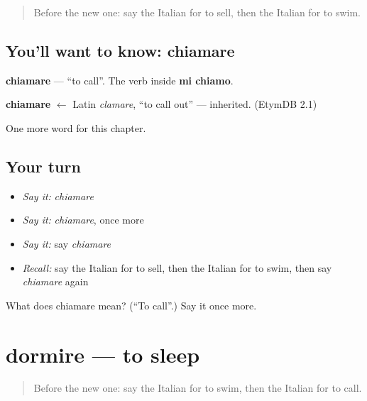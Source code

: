 \label{lesson:IT-C48-chiamare}



\begin{quote}
Before the new one: say the Italian for to sell, then the Italian for to swim.
\end{quote}

\subsection*{You'll want to know: chiamare}
\textbf{chiamare} — \textquotedblleft{}to call\textquotedblright{}. The verb inside \textbf{mi chiamo}.

\begin{cousinweb}
\textbf{chiamare} $\leftarrow$ Latin \emph{clamare}, \textquotedblleft{}to call out\textquotedblright{} — inherited. (EtymDB 2.1)
\end{cousinweb}

\begin{grammarlens}[title={What you've built}]
One more word for this chapter.
\end{grammarlens}

\subsection*{Your turn}
\begin{itemize}
\raggedright
  \item \emph{Say it:} \emph{chiamare}
  \item \emph{Say it:} \emph{chiamare}, once more
  \item \emph{Say it:} say \emph{chiamare}
  \item \emph{Recall:} say the Italian for to sell, then the Italian for to swim, then say \emph{chiamare} again
\end{itemize}

\begin{tcolorbox}[breakable,colback=teal!4,colframe=teal!35!black,title={Before you move on}]
What does chiamare mean? (\textquotedblleft{}To call\textquotedblright{}.) Say it once more.
\end{tcolorbox}
\section[dormire]{dormire — to sleep}

\label{lesson:IT-C48-dormire}



\begin{quote}
Before the new one: say the Italian for to swim, then the Italian for to call.
\end{quote}


